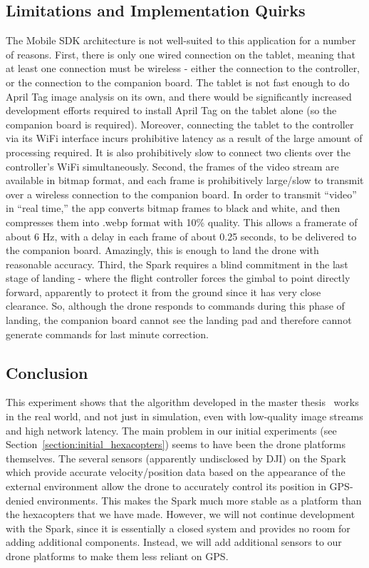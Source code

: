 \subsection{Limitations and Implementation Quirks}

The Mobile SDK architecture is not well-suited to this application for a number of reasons.
First, there is only one wired connection on the tablet, meaning that at least one connection
must be wireless - either the connection to the controller, or the connection to the companion board.
The tablet is not fast enough to do April Tag image analysis on its own,
and there would be significantly increased development efforts required to install April Tag
on the tablet alone (so the companion board is required).
Moreover, connecting the tablet to the controller via its WiFi interface incurs prohibitive latency
as a result of the large amount of processing required.
It is also prohibitively slow to connect two clients over the controller's WiFi simultaneously.
Second, the frames of the video stream are available in bitmap format,
and each frame is prohibitively large/slow to transmit over a wireless connection to the companion board.
In order to transmit ``video'' in ``real time,'' the app converts bitmap frames to black and white,
and then compresses them into .webp format with 10\% quality.
This allows a framerate of about 6 Hz, with a delay in each frame of about 0.25 seconds,
to be delivered to the companion board.
Amazingly, this is enough to land the drone with reasonable accuracy.
Third, the Spark requires a blind commitment in the last stage of landing
- where the flight controller forces the gimbal to point directly forward,
apparently to protect it from the ground since it has very close clearance.
So, although the drone responds to commands during this phase of landing,
the companion board cannot see the landing pad and therefore cannot generate commands
for last minute correction.

\subsection{Conclusion}

This experiment shows that the algorithm developed in the master thesis~\cite{joshua_master_thesis} works in the real world,
and not just in simulation, even with low-quality image streams and high network latency.
The main problem in our initial experiments (see Section~\ref{section:initial_hexacopters}) seems to have been the drone platforms themselves.
The several sensors (apparently undisclosed by DJI) on the Spark which provide accurate velocity/position data based on the appearance of the external environment
allow the drone to accurately control its position in GPS-denied environments.
This makes the Spark much more stable as a platform than the hexacopters that we have made.
However, we will not continue development with the Spark, since it is essentially a closed system and provides no
room for adding additional components.
Instead, we will add additional sensors to our drone platforms to make them less reliant on GPS.